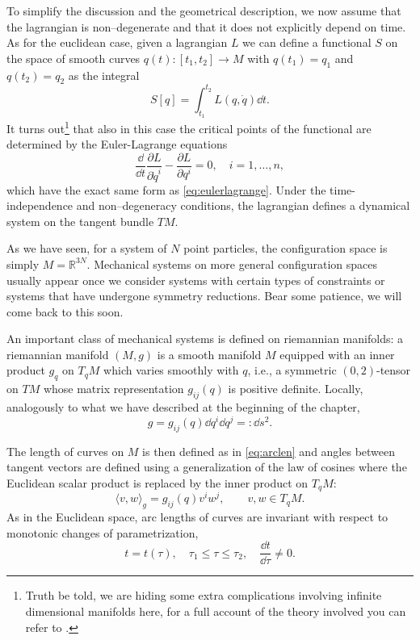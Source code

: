 \documentclass[english,fontsize=11pt,paper=b5]{scrbook}
\theoremstyle{definition}
\begin{document}
    To simplify the discussion and the geometrical description, we now assume that the lagrangian is non--degenerate and that it does not explicitly depend on time.
    As for the euclidean case, given a lagrangian $L$ we can define a functional $S$ on the space of smooth curves $q(t): [t_1,t_2] \to M$ with $q(t_1) = q_1$ and $q(t_2) = q_2$ as the integral
    \begin{equation}
      S[q] = \int_{t_1}^{t_2} L(q,\dot q) \dd t.
    \end{equation}
    It turns out\footnote{Truth be told, we are hiding some extra complications involving infinite dimensional manifolds here, for a full account of the theory involved you can refer to \cite[Chapters 7 and 8]{book:marsdenratiu}.} that also in this case the critical points of the functional are determined by the Euler-Lagrange equations
    \begin{equation}
      \frac{\dd}{\dd t}\frac{\partial L}{\partial \dot q^i} - \frac{\partial L}{\partial q^i} =0, \quad i=1,\ldots,n,
    \end{equation}
    which have the exact same form as \eqref{eq:eulerlagrange}.
    Under the time-independence and non--degeneracy conditions, the lagrangian defines a dynamical system on the tangent bundle $TM$.

    As we have seen, for a system of $N$ point particles, the configuration space is simply $M=\mathbb{R}^{3N}$. Mechanical systems on more general configuration spaces usually appear once we consider systems with certain types of constraints or systems that have undergone symmetry reductions.
    Bear some patience, we will come back to this soon.
    \medskip

    An important class of mechanical systems is defined on riemannian manifolds: a riemannian manifold $(M, g)$ is a smooth manifold $M$ equipped with an inner product $g_q$ on $T_q M$ which varies smoothly with $q$, i.e., a symmetric $(0,2)$-tensor on $TM$ whose matrix representation $g_{ij}(q)$ is positive definite.
    Locally, analogously to what we have described at the beginning of the chapter,
    \begin{equation}
      g = g_{ij}(q) \dd q^i \dd q^j =: \dd s^2.
    \end{equation}

    The length of curves on $M$ is then defined as in \eqref{eq:arclen} and angles between tangent vectors are defined using a generalization of the law of cosines where the Euclidean scalar product is replaced by the inner product on $T_qM$:
    \begin{equation}
      \langle v, w\rangle_g = g_{ij}(q) v^i w^j, \qquad v,w\in T_q M.
    \end{equation}
    As in the Euclidean space, arc lengths of curves are invariant with respect to monotonic changes of parametrization,
    \begin{equation}
      t = t(\tau),\quad \tau_1\leq \tau\leq \tau_2, \quad \frac{\dd t}{\dd \tau}\neq 0.
    \end{equation}
\end{document}
